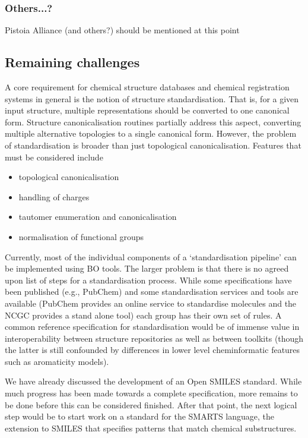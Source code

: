 \documentclass[10pt]{bmc_article}
\newenvironment{bmcformat}{\fussy\setboolean{publ}{true}}{\fussy}
\begin{document}
\begin{bmcformat}
\subsubsection*{Others...?}

Pistoia Alliance (and others?) should be mentioned at this point

  \subsection*{Remaining challenges}

A core requirement for chemical structure databases and chemical
registration systems in general is the notion of structure
standardisation.  That is,  for a given input structure, multiple
representations should be converted to one canonical form.
Structure canonicalisation routines partially address this aspect,
converting multiple alternative topologies to a single canonical
form. However, the problem of standardisation is broader than just
topological canonicalisation. Features that must be considered include
\begin{itemize}
\item topological canonicalisation
\item handling of charges
\item tautomer enumeration and canonicalisation
\item normalisation of functional groups
\end{itemize}
Currently, most of the individual components of a `standardisation
pipeline' can be implemented using BO tools. The larger problem is
that there is no agreed upon list of steps for a standardisation
process. While some specifications have been published (e.g., PubChem)
and some standardisation services and tools are available (PubChem
provides an online service to standardise molecules and the NCGC
provides a stand alone tool) each group has their own set of rules. A
common reference specification for standardisation would be of immense
value in interoperability between structure repositories as well as
between toolkits (though the latter is still confounded by differences
in lower level cheminformatic features such as aromaticity models).

We have already discussed the development of an Open SMILES standard.
While much progress has been made towards a complete specification,
more remains to be done before this can be considered finished. After
that point, the next logical step would be to start work on a standard
for the SMARTS language, the extension to SMILES that specifies
patterns that match chemical substructures.


\end{bmcformat}
\end{document}
